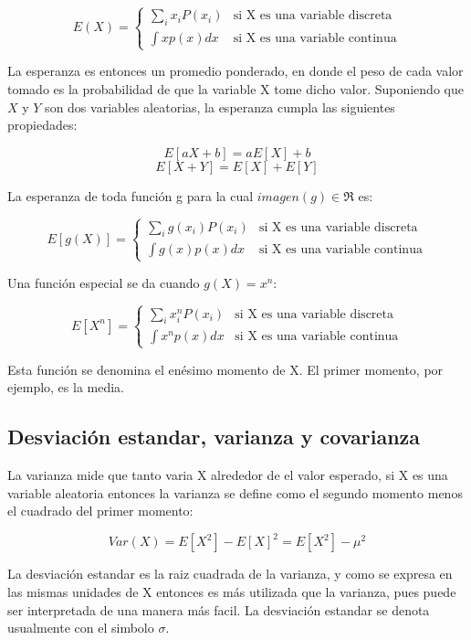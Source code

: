 \documentclass[a4paper, 11pt, oneside]{report}
\begin{document}
	\[ E(X) = \left\{ \begin{array}{ll}
		\sum_{i}{x_iP(x_i)}   & \mbox{si X es una variable discreta} \\
		\int {xp(x)dx} & \mbox{si X es una variable continua}
	\end{array} \right. \]

La esperanza es entonces un promedio ponderado, en donde el peso de cada valor tomado es la probabilidad de que la variable X tome dicho valor. Suponiendo que $X$ y $Y$ son dos variables aleatorias, la esperanza cumpla las siguientes propiedades:

	\[E[aX + b] = aE[X] + b\]
	\[E[X + Y] = E[X] + E[Y]\]

La esperanza de toda función g para la cual $imagen(g) \in \Re$ es:

	\[ E[g(X)] = \left\{ \begin{array}{ll}
		\sum_{i}{g(x_i)P(x_i)}   & \mbox{si X es una variable discreta} \\
		\int {g(x)p(x)dx} & \mbox{si X es una variable continua}
	\end{array} \right. \]

Una función especial se da cuando $g(X) = x^n$:

	\[ E[X^n] = \left\{ \begin{array}{ll}
		\sum_{i}{x_i^nP(x_i)}   & \mbox{si X es una variable discreta} \\
		\int {x^np(x)dx} & \mbox{si X es una variable continua}
	\end{array} \right. \]

Esta función se denomina el enésimo momento de X. El primer momento, por ejemplo, es la media.

\subsection{Desviación estandar, varianza y covarianza}

La varianza mide que tanto varia X alrededor de el valor esperado, si X es una variable aleatoria entonces la varianza se define como el segundo momento menos el cuadrado del primer momento:

	\[Var(X) = E[X^2] - E[X]^2 = E[X^2] - \mu^2\]

La desviación estandar es la raiz cuadrada de la varianza, y como se expresa en las mismas unidades de X entonces es más utilizada que la varianza, pues puede ser interpretada de una manera más facil. La desviación estandar se denota usualmente con el simbolo $\sigma$.
\end{document}
